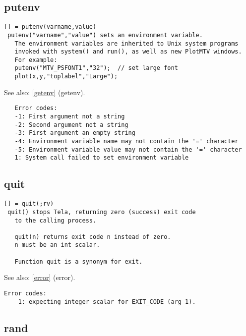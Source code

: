 \documentclass[a4paper]{article}
\begin{document}
\subsection{putenv\label{putenv}}

\begin{tscreen}
\begin{verbatim}
[] = putenv(varname,value)
 putenv("varname","value") sets an environment variable.
   The environment variables are inherited to Unix system programs
   invoked with system() and run(), as well as new PlotMTV windows.
   For example:
   putenv("MTV_PSFONT1","32");  // set large font
   plot(x,y,"toplabel","Large");
\end{verbatim}

See also: \ref{getenv} {(getenv)}.
\begin{verbatim}
   Error codes:
   -1: First argument not a string
   -2: Second argument not a string
   -3: First argument an empty string
   -4: Environment variable name may not contain the '=' character
   -5: Environment variable value may not contain the '=' character
   1: System call failed to set environment variable
\end{verbatim}
\end{tscreen}





\subsection{quit\label{quit}}

\begin{tscreen}
\begin{verbatim}
[] = quit(;rv)
 quit() stops Tela, returning zero (success) exit code
   to the calling process.

   quit(n) returns exit code n instead of zero.
   n must be an int scalar.

   Function quit is a synonym for exit.
\end{verbatim}

See also: \ref{error} {(error)}.
\begin{verbatim}
Error codes:
    1: expecting integer scalar for EXIT_CODE (arg 1).
\end{verbatim}
\end{tscreen}





\subsection{rand\label{rand}}
\end{document}
